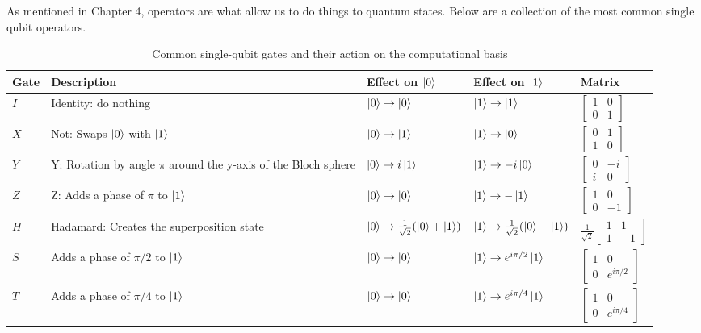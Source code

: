 As mentioned in Chapter 4, operators are what allow us to do things to quantum states. Below are a collection of the most common single qubit operators. 
\begin{table}[ht!]
\centering

\label{tab:single_qubit_gates}
\begin{tabular}{|m{1cm}| m{5cm} | m{3cm} | m{3cm} | m{2cm}|} 
\hline
 Gate & Description & Effect on $\ket{0}$ & Effect on $\ket{1}$ & Matrix \\ [0.5ex] 
\hline
 $I$ & Identity: do nothing & $\ket{0} \rightarrow  \ket{0} $ & $\ket{1} \rightarrow \ket{1}$ & $\begin{bmatrix} 1 & 0 \\ 0 & 1 \end{bmatrix}$ \\ 
\hline
 $X$ & Not: Swaps $\ket{0}$ with $\ket{1}$   &$\ket{0} \rightarrow \ket{1}$ &$\ket{1} \rightarrow  \ket{0}$ & $\begin{bmatrix} 0 & 1 \\ 1 & 0 \end{bmatrix}$ \\
\hline
 $Y$ & Y: Rotation by angle $\pi$ around the y-axis of the Bloch sphere & $\ket{0} \rightarrow  i\ket{1} $ & $\ket{1} \rightarrow -i\ket{0} $ & $\begin{bmatrix} 0 & -i \\ i & 0 \end{bmatrix}$ \\
\hline
 $Z$ & Z: Adds a phase of $\pi$ to $\ket{1}$&$\ket{0} \rightarrow \ket{0}$&$\ket{1} \rightarrow -\ket{1}$ &$\begin{bmatrix} 1 & 0 \\ 0 & -1 \end{bmatrix}$  \\
\hline
 $H$ & Hadamard: Creates the superposition state & $\ket{0} \rightarrow \frac{1}{\sqrt{2}} ( \ket{0} + \ket{1})$ & $\ket{1} \rightarrow \frac{1}{\sqrt{2}} ( \ket{0} - \ket{1})$ & $\frac{1}{\sqrt{2}}\begin{bmatrix} 1 & 1 \\ 1 & -1 \end{bmatrix} $\\
\hline
 $S$ & Adds a phase of $\pi/2$ to $\ket{1}$ &$\ket{0} \rightarrow  \ket{0} $ &$\ket{1} \rightarrow e^{i\pi/2}\ket{1}$  & $\begin{bmatrix} 1 & 0 \\ 0 & e^{i\pi/2} \end{bmatrix}$\\
\hline
 $T$ & Adds a phase of $\pi/4$ to $\ket{1}$ &  $\ket{0} \rightarrow  \ket{0} $& $\ket{1} \rightarrow e^{i\pi/4}\ket{1}$ & $\begin{bmatrix} 1 & 0 \\ 0 & e^{i\pi/4} \end{bmatrix}$\\ 
\hline
\end{tabular}
\caption{Common single-qubit gates and their action on the computational basis}
\end{table}

